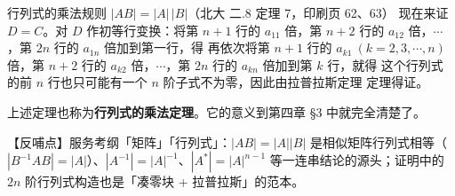 \begin{fdeep}{行列式的乘法规则 $|AB|=|A|\,|B|$（北大 二.8 定理 7，印刷页 62、63）}
现在来证 $D=C$。对 $D$ 作初等行变换：将第 $n+1$ 行的 $a_{11}$ 倍，第 $n+2$ 行的 $a_{12}$ 倍，$\cdots$，第 $2n$ 行的 $a_{1n}$ 倍加到第一行，得
再依次将第 $n+1$ 行的 $a_{k1}\ (k=2,3,\cdots,n)$ 倍，第 $n+2$ 行的 $a_{k2}$ 倍，$\cdots$，第 $2n$ 行的 $a_{kn}$ 倍加到第 $k$ 行，就得
这个行列式的前 $n$ 行也只可能有一个 $n$ 阶子式不为零，因此由拉普拉斯定理
定理得证。

上述定理也称为\textbf{行列式的乘法定理}。它的意义到第四章 §3 中就完全清楚了。

【反哺点】服务考纲「矩阵」「行列式」：$|AB|=|A||B|$ 是相似矩阵行列式相等（$|B^{-1}AB|=|A|$）、$|A^{-1}|=|A|^{-1}$、$|A^{*}|=|A|^{n-1}$ 等一连串结论的源头；证明中的 $2n$ 阶行列式构造也是「凑零块 + 拉普拉斯」的范本。
\end{fdeep}

